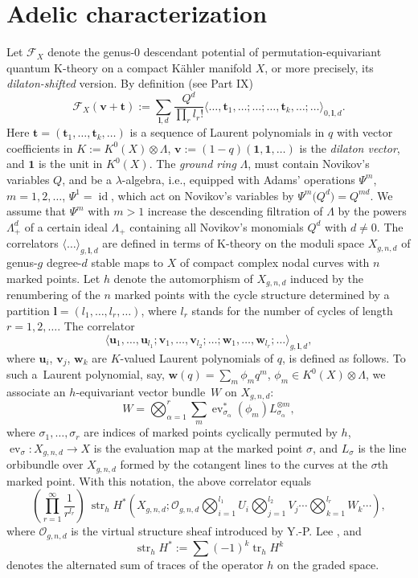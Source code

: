 \documentclass[pdftex]{sigma}
\def\F{\mathcal F}
\def\O{\mathcal O}
\def\1{\mathbf 1}
\def\a{\alpha}
\def\t{{\mathbf t}}
\def\ll{{\mathbf l}}
\def\vv{{\mathbf v}}
\def\uu{{\mathbf u}}
\def\ww{{\mathbf w}}
\def\lan{\langle}
\def\ran{\rangle}
\def\str{\operatorname{str}}
\def\ev{\operatorname{ev}}
\def\tr{\operatorname{tr}}
\def\str{\operatorname{str}}
\begin{document}
\section{Adelic characterization}

Let $\F_X$ denote the genus-0 descendant potential of permutation-equivariant
quantum K-theory on a compact K\"ahler manifold $X$, or more precisely, its {\em dilaton-shifted} version. By definition (see Part IX)
\[ \F_X(\vv+\t) := \sum_{\ll, d} \frac{Q^d}{\prod_r l_r!} \lan \dots, \t_1, \dots; \dots ; \dots, \t_k, \dots; \dots \ran_{0,\ll,d}.\]
Here $\t=(\t_1,\dots, \t_k,\dots)$ is a sequence of Laurent polynomials in $q$ with vector coefficients in $K:=K^0(X)\otimes \Lambda$, $\vv :=(1-q) (\1,\1,\dots)$ is the {\em dilaton vector}, and $\1$ is the unit in $K^0(X)$. The {\em ground ring} $\Lambda$, must contain Novikov's variables $Q$, and be a $\lambda$-algebra, i.e., equipped with Adams' operations $\Psi^m$, $m=1,2,\dots$, $\Psi^1=\operatorname{id}$, which act on Novikov's variables by $\Psi^m\big(Q^d\big)=Q^{md}$. We assume that $\Psi^m$ with $m>1$ increase the descending filtration of $\Lambda$ by the powers $\Lambda_{+}^d$ of a certain ideal $\Lambda_{+}$ containing all Novikov's monomials $Q^d$ with $d\neq 0$. The correlators $\lan \dots \ran_{g,\ll,d}$ are defined in terms of K-theory on the moduli space $X_{g,n,d}$ of genus-$g$ degree-$d$ stable maps to $X$ of compact complex nodal curves with $n$ marked points. Let $h$ denote the automorphism of $X_{g,n,d}$ induced by the renumbering of the $n$ marked points with the cycle structure
determined by a partition $\ll=(l_1,\dots,l_r,\dots)$, where $l_r$ stands for the number of cycles of length $r=1,2,\dots$. The correlator
\[ \lan \uu_1,\dots, \uu_{l_1}; \vv_1, \dots, \vv_{l_2}; \dots ; \ww_1, \dots, \ww_{l_r}; \dots \ran_{g,\ll,d},\]
where $\uu_i$, $\vv_j$, $\ww_k$ are $K$-valued Laurent polynomials of $q$, is defined as follows. To such a~Laurent polynomial, say, $\ww(q)=\sum_m \phi_m q^m$, $\phi_m\in K^0(X)\otimes \Lambda$, we associate an $h$-equivariant vector bundle~$W$ on $X_{g,n,d}$:
\[ W = \bigotimes_{\a=1}^r \sum_m \ev_{\sigma_\a}^*(\phi_m) L_{\sigma_\a}^{\otimes m},\]
where $\sigma_1,\dots,\sigma_r$ are indices of marked points cyclically permuted by $h$, $\ev_{\sigma}\colon X_{g,n,d}\to X$ is the evaluation map at the marked point $\sigma$, and $L_{\sigma}$ is the line orbibundle over $X_{g,n,d}$ formed by the cotangent lines to the curves at the $\sigma$th marked point.
With this notation, the above correlator equals
\[ \left(\prod_{r=1}^{\infty}\frac{1}{ r^{l_r}}\right) \ \str_h H^*\left(X_{g,n,d}; \O_{g,n,d}\bigotimes_{i=1}^{l_1} U_i \bigotimes_{j=1}^{l_2} V_j \cdots \bigotimes_{k=1}^{l_r}W_k \cdots \right) ,\]
where $\O_{g,n,d}$ is the virtual structure sheaf introduced by Y.-P. Lee \cite{YPLee}, and
\[\str_h H^* := \sum (-1)^k\tr_h H^k\] denotes the alternated sum of traces of the operator $h$ on the graded space.
\end{document}
